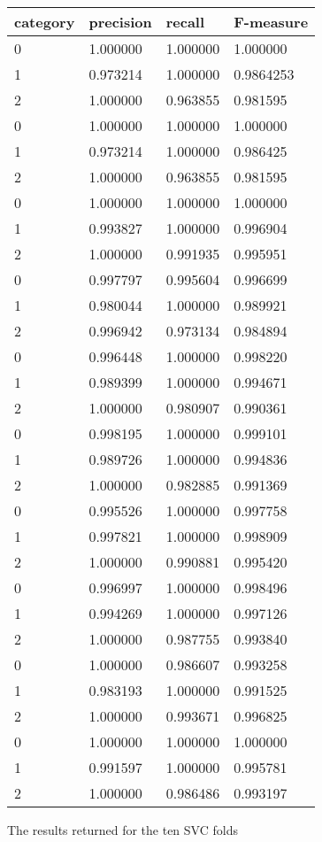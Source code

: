 \documentclass[
10pt, %
a4paper, %
oneside, %
headinclude,footinclude, %
] {book}%
\begin{document}
\newpage

\begin{figure}[t]
\begin{tabular}{llll}
	category & precision & recall & F-measure \\
	\hline
	 0 & 1.000000  & 1.000000  & 1.000000  \\
	 1 & 0.973214  &1.000000  & 0.9864253 \\
	 2 & 1.000000  & 0.963855  & 0.981595 \\
	\hline
	 0 & 1.000000  & 1.000000  & 1.000000 \\
	 1 & 0.973214  & 1.000000  & 0.986425 \\
	 2 & 1.000000  & 0.963855  & 0.981595 \\
	\hline
	 0 & 1.000000 & 1.000000 & 1.000000 \\
	 1 & 0.993827 & 1.000000 & 0.996904 \\
	 2 & 1.000000 & 0.991935 & 0.995951 \\
	\hline
	0 & 0.997797 & 0.995604 & 0.996699 \\
	1 & 0.980044 & 1.000000 & 0.989921 \\
	2 & 0.996942 & 0.973134 & 0.984894 \\
	\hline
	0 & 0.996448 & 1.000000 & 0.998220 \\
	1 & 0.989399 & 1.000000 & 0.994671 \\
	2 & 1.000000 & 0.980907 & 0.990361 \\
	\hline
	0 & 0.998195 & 1.000000 & 0.999101 \\
	1 & 0.989726 & 1.000000 & 0.994836 \\
	2 & 1.000000 & 0.982885 & 0.991369 \\
	\hline
	0 & 0.995526 & 1.000000 & 0.997758 \\
	1 & 0.997821 & 1.000000 & 0.998909 \\
	2 & 1.000000 & 0.990881 & 0.995420 \\
	\hline
	0 & 0.996997 & 1.000000 & 0.998496 \\
	1 & 0.994269 & 1.000000 & 0.997126 \\
	2 & 1.000000 & 0.987755 & 0.993840 \\
	\hline
	0 & 1.000000 & 0.986607 & 0.993258 \\
	1 & 0.983193 & 1.000000 & 0.991525 \\
	2 & 1.000000 & 0.993671 & 0.996825 \\
	\hline
	0 & 1.000000 & 1.000000 & 1.000000 \\
	1 & 0.991597 & 1.000000 & 0.995781 \\
	2 & 1.000000 & 0.986486 & 0.993197 \\
	\hline

\end{tabular}
\caption{The results returned for the ten SVC folds}
\end{figure}
\end{document}
